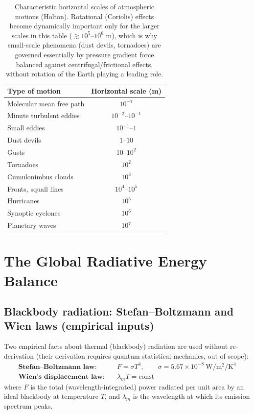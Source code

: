 \documentclass[11pt]{article}
\begin{document}
\begin{table}[h!]
\centering
\begin{tabular}{@{}lc@{}}
\toprule
Type of motion & Horizontal scale (m) \\
\midrule
Molecular mean free path & $10^{-7}$ \\
Minute turbulent eddies & $10^{-2}$--$10^{-1}$ \\
Small eddies & $10^{-1}$--$1$ \\
Dust devils & $1$--$10$ \\
Gusts & $10$--$10^{2}$ \\
Tornadoes & $10^{2}$ \\
Cumulonimbus clouds & $10^{3}$ \\
Fronts, squall lines & $10^{4}$--$10^{5}$ \\
Hurricanes & $10^{5}$ \\
Synoptic cyclones & $10^{6}$ \\
Planetary waves & $10^{7}$ \\
\bottomrule
\end{tabular}
\caption{Characteristic horizontal scales of atmospheric motions (Holton). Rotational (Coriolis) effects become dynamically important only for the larger scales in this table ($\gtrsim10^5$--$10^6$ m), which is why small-scale phenomena (dust devils, tornadoes) are governed essentially by pressure gradient force balanced against centrifugal/frictional effects, without rotation of the Earth playing a leading role.}
\end{table}

\section{The Global Radiative Energy Balance}
\label{sec:radbalance}

\subsection{Blackbody radiation: Stefan--Boltzmann and Wien laws (empirical inputs)}
Two empirical facts about thermal (blackbody) radiation are used without re-derivation (their derivation requires quantum statistical mechanics, out of scope):
\begin{align}
\textbf{Stefan--Boltzmann law:}\quad & F = \sigma T^4, \qquad \sigma = 5.67\times10^{-8}\ \si{\watt\per\square\m\per\kelvin\tothe{4}} \label{eq:SB}\\
\textbf{Wien's displacement law:}\quad & \lambda_m T = \text{const} \label{eq:wien}
\end{align}
where $F$ is the total (wavelength-integrated) power radiated per unit area by an ideal blackbody at temperature $T$, and $\lambda_m$ is the wavelength at which its emission spectrum peaks.
\end{document}
